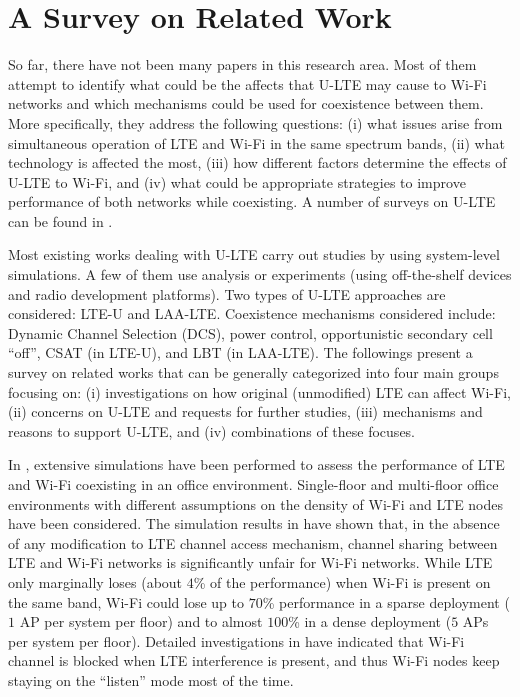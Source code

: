 \documentclass[journal,draftclsnofoot,12pt,onecolumn]{IEEEtran}
\begin{document}

\section{A Survey on Related Work}
\label{sec:relatedwork}

\noindent So far, there have not been many papers in this research area. Most of them attempt to identify what could be the affects that U-LTE may cause to Wi-Fi networks and which mechanisms could be used for coexistence between them. More specifically, they address the following questions: (i) what issues arise from simultaneous operation of LTE and Wi-Fi in the same spectrum bands, (ii) what technology is affected the most, (iii) how different factors determine the effects of U-LTE to Wi-Fi, and (iv) what could be appropriate strategies to improve performance of both networks while coexisting. A number of surveys on U-LTE can be found in \cite{U-LTE-survey-2014, U-LTE-survey-2015, U-LTE-5G-2015}.

Most existing works dealing with U-LTE carry out studies by using system-level simulations. A few of them use analysis or experiments (using off-the-shelf devices and radio development platforms). Two types of U-LTE approaches are considered: LTE-U and LAA-LTE. Coexistence mechanisms considered include: Dynamic Channel Selection (DCS), power control, opportunistic secondary cell ``off'', CSAT (in LTE-U), and LBT (in LAA-LTE). The followings present a survey on related works that can be generally categorized into four main groups focusing on: (i) investigations on how original (unmodified) LTE can affect Wi-Fi, (ii) concerns on U-LTE and requests for further studies, (iii) mechanisms and reasons to support U-LTE, and (iv) combinations of these focuses.

In \cite{original-LTE-Wi-Fi-VTC-2013}, extensive simulations have been performed to assess the performance of LTE and Wi-Fi coexisting in an office environment. Single-floor and multi-floor office environments with different assumptions on the density of Wi-Fi and LTE nodes have been considered. The simulation results in \cite{original-LTE-Wi-Fi-VTC-2013} have shown that, in the absence of any modification to LTE channel access mechanism, channel sharing between LTE and Wi-Fi networks is significantly unfair for Wi-Fi networks. While LTE only marginally loses (about $4$\% of the performance) when Wi-Fi is present on the same band, Wi-Fi could lose up to $70$\% performance in a sparse deployment ($1$ AP per system per floor) and to almost $100$\% in a dense deployment ($5$ APs per system per floor). Detailed investigations in \cite{original-LTE-Wi-Fi-VTC-2013} have indicated that Wi-Fi channel is blocked when LTE interference is present, and thus Wi-Fi nodes keep staying on the ``listen'' mode most of the time.
\end{document}
